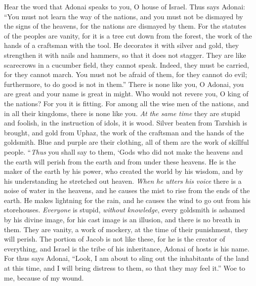 \begin{biblechapter} %
\verse Hear the word that Adonai speaks to you, O house of Israel.
\verse Thus says Adonai:
\verse “You must not learn the way of the nations, 
and you must not be dismayed by the signs of the heavens, 
for the nations are dismayed by them.
\verse For the statutes of the peoples are vanity, 
for it is a tree cut down from the forest, 
the work of the hands of a craftsman with the tool.
\verse He decorates it with silver and gold, 
they strengthen it with nails and hammers, 
so that it does not stagger.
\verse They are like scarecrows in a cucumber field, 
they cannot speak. 
Indeed, they must be carried, 
for they cannot march. 
You must not be afraid of them, 
for they cannot do evil; 
furthermore, to do good is not in them.”
\verse There is none like you, O Adonai, 
you are great and your name is great in might.
\verse Who would not revere you, O king of the nations? 
For you it is fitting. 
For among all the wise men of the nations, 
and in all their kingdoms, 
there is none like you.
\verse \textit{At the same time} they are stupid and foolish, 
in the instruction of idols, it is wood.
\verse Silver beaten from Tarshish is brought, 
and gold from Uphaz, 
the work of the craftsman and the hands of the goldsmith. 
Blue and purple are their clothing, 
all of them are the work of skillful people.
\verse “\textit{Thus} you shall say to them,
\verse ‘Gods who did not make the heavens and the earth 
will perish from the earth and from under these heavens.
\verse He is the maker of the earth by his power, 
who created the world by his wisdom, 
and by his understanding he stretched out heaven.
\verse \textit{When he utters his voice} there is a noise of water in the heavens, 
and he causes the mist to rise from the ends of the earth. 
He makes lightning for the rain, 
and he causes the wind to go out from his storehouses.
\verse \textit{Everyone} is stupid, \textit{without knowledge}, 
every goldsmith is ashamed by his divine image, 
for his cast image is an illusion, 
and there is no breath in them.
\verse They are vanity, a work of mockery, 
at the time of their punishment, they will perish.
\verse The portion of Jacob is not like these, 
for he is the creator of everything, 
and Israel is the tribe of his inheritance, 
Adonai of hosts is his name.
\verse For thus says Adonai, “Look, I am about to sling out the inhabitants of the land at this time, 
and I will bring distress to them, so that they may feel it.”
 Woe to me, because of my wound. 

\end{biblechapter}
